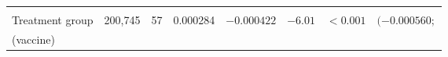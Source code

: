 \documentclass[11pt,a4paper,openany]{book}
\begin{document}
\begin{longtable}[]{@{}lrrrrrrr@{}}
\begin{minipage}[t]{0.07\columnwidth}
\strut
\end{minipage}\tabularnewline
\begin{minipage}[t]{0.35\columnwidth}\raggedright\strut
Treatment group\strut
\end{minipage} & \begin{minipage}[t]{0.05\columnwidth}\raggedleft\strut
200,745\strut
\end{minipage} & \begin{minipage}[t]{0.04\columnwidth}\raggedleft\strut
57\strut
\end{minipage} & \begin{minipage}[t]{0.06\columnwidth}\raggedleft\strut
0.000284\strut
\end{minipage} & \begin{minipage}[t]{0.11\columnwidth}\raggedleft\strut
\(-0.000422\)\strut
\end{minipage} & \begin{minipage}[t]{0.05\columnwidth}\raggedleft\strut
\(-6.01\)\strut
\end{minipage} & \begin{minipage}[t]{0.05\columnwidth}\raggedleft\strut
\(<0.001\)\strut
\end{minipage} & \begin{minipage}[t]{0.07\columnwidth}\raggedleft\strut
\((-0.000560;\)\strut
\end{minipage}\tabularnewline
\begin{minipage}[t]{0.35\columnwidth}\raggedright\strut
(vaccine)\strut
\end{minipage} & \begin{minipage}[t]{0.05\columnwidth}\raggedleft\strut
\strut
\end{minipage} & \begin{minipage}[t]{0.04\columnwidth}\raggedleft\strut
\strut
\end{minipage} & \begin{minipage}[t]{0.06\columnwidth}\raggedleft\strut
\strut
\end{minipage} & \begin{minipage}[t]{0.11\columnwidth}\raggedleft\strut
\strut
\end{minipage} & \begin{minipage}[t]{0.05\columnwidth}\raggedleft\strut
\strut
\end{minipage} & \begin{minipage}[t]{0.05\columnwidth}\raggedleft\strut
\strut
\end{minipage} & \begin{minipage}[t]{0.07\columnwidth}\raggedleft\strut

\end{minipage}
\end{longtable}
\end{document}
